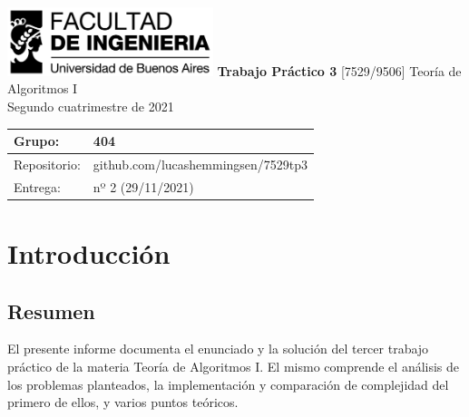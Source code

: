 \documentclass[titlepage,a4paper]{article}
\begin{document}
\begin{titlepage} %
	\hfill\includegraphics[width=6cm]{img/logofiuba.jpg}
    \centering
    \vfill
    \Huge \textbf{Trabajo Práctico 3}
    \vskip2cm
    \Large [7529/9506] Teoría de Algoritmos I\\
    Segundo cuatrimestre de 2021
    \vfill
    \begin{tabular}{ | l | l | } %
      \hline
      Grupo: & 404 \\ \hline
      Repositorio: & github.com/lucashemmingsen/7529tp3 \\ \hline
      Entrega: & nº 2 (29/11/2021) \\ \hline
  	\end{tabular}
    \vfill
    
    \vfill
\end{titlepage}

\tableofcontents %
\newpage

\renewcommand{\thesection}{\Alph{section}}%
\setcounter{section}{8} %

\section{Introducción}\label{sec:intro}
\subsection{Resumen}
El presente informe documenta el enunciado y la solución del tercer trabajo práctico
de la materia Teoría de Algoritmos I. El mismo comprende el análisis de los problemas
planteados, la implementación y comparación de complejidad del primero de ellos, y
varios puntos teóricos.
\end{document}
